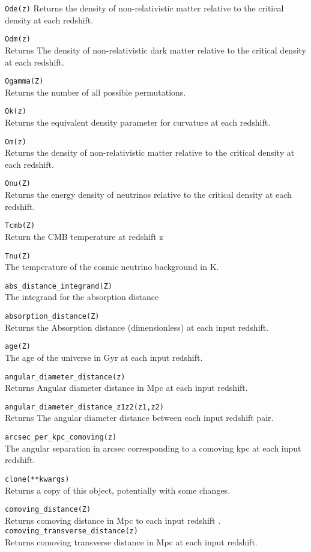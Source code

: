 \begin{multicols}{3}
\verb!Ode(z)!
Returns the density of non-relativistic matter relative to the critical density at each redshift.

\verb!Odm(z)!\\
Returns The density of non-relativistic dark matter relative to the critical density at each redshift.

\verb!Ogamma(Z)!\\
Returns the number of all possible permutations.

\verb!Ok(z)!\\
Returns the equivalent density parameter for curvature at each redshift.

\verb!Om(z)!\\
Returns the density of non-relativistic matter relative to the critical density at each redshift.

\verb!Onu(Z)!\\
Returns the energy density of neutrinos relative to the critical density at each redshift.

\verb!Tcmb(Z)! \\
Return the CMB temperature at redshift z

\verb!Tnu(Z)!\\
The temperature of the cosmic neutrino background in K.

\verb!abs_distance_integrand(Z)!\\
The integrand for the absorption distance

\verb!absorption_distance(Z)!\\
Returns the Absorption distance (dimensionless) at each input redshift.

\verb!age(Z)!\\
The age of the universe in Gyr at each input redshift.

\verb!angular_diameter_distance(z)!\\
Returns Angular diameter distance in Mpc at each input redshift.

\verb!angular_diameter_distance_z1z2(z1,z2)!\\
Returns The angular diameter distance between each input redshift pair.

\verb!arcsec_per_kpc_comoving(z)!\\
The angular separation in arcsec corresponding to a comoving kpc at each input redshift.

\verb!clone(**kwargs)!\\
Returns a copy of this object, potentially with some changes.

\verb!comoving_distance(Z)!\\
Returns comoving distance in Mpc to each input redshift
.
\verb!comoving_transverse_distance(z)!\\
Returns comoving transverse distance in Mpc at each input redshift.


\end{multicols}
